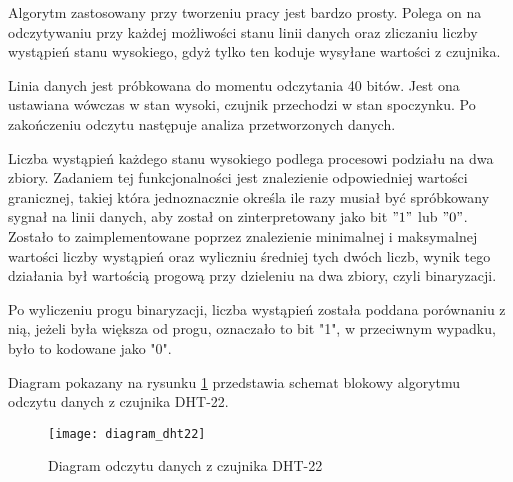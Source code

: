 Algorytm zastosowany przy tworzeniu pracy jest bardzo prosty. Polega on na odczytywaniu przy każdej możliwości stanu linii danych oraz zliczaniu liczby wystąpień stanu wysokiego, gdyż tylko ten koduje wysyłane wartości z czujnika.

Linia danych jest próbkowana do momentu odczytania 40 bitów. Jest ona ustawiana wówczas w stan wysoki, czujnik przechodzi w stan spoczynku. Po zakończeniu odczytu następuje analiza przetworzonych danych.

Liczba wystąpień każdego stanu wysokiego podlega procesowi podziału na dwa zbiory. Zadaniem tej funkcjonalności jest znalezienie odpowiedniej wartości granicznej, takiej która jednoznacznie określa ile razy musiał być spróbkowany sygnał na linii danych, aby został on zinterpretowany jako bit $"1"$ lub $"0"$. Zostało to zaimplementowane poprzez znalezienie minimalnej i maksymalnej wartości liczby wystąpień oraz wyliczniu średniej tych dwóch liczb, wynik tego działania był wartością progową przy dzieleniu na dwa zbiory, czyli binaryzacji.

Po wyliczeniu progu binaryzacji, liczba wystąpień została poddana porównaniu z nią, jeżeli była większa od progu, oznaczało to bit "1", w przeciwnym wypadku, było to kodowane jako "0".

Diagram pokazany na rysunku \ref{fig:diagram_dht22} przedstawia schemat blokowy algorytmu odczytu danych z czujnika DHT-22.
\begin{figure}[h]
\centering
\texttt{[image: diagram\_dht22]}
\caption{Diagram odczytu danych z czujnika DHT-22}
\label{fig:diagram_dht22}
\end{figure}